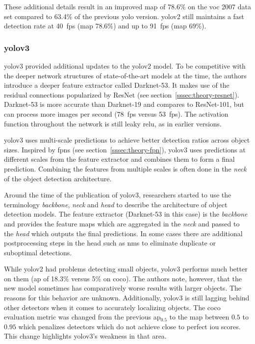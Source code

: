 \documentclass[draft,final]{vutinfth} %
\begin{document}
These additional details result in an improved \gls{map} of 78.6\% on
the \gls{voc} 2007 data set compared to 63.4\% of the previous
\gls{yolo} version. \gls{yolo}v2 still maintains a fast detection rate
at \qty{40}{fps} (\gls{map} 78.6\%) and up to \qty{91}{fps} (\gls{map}
69\%).

\subsubsection{\gls{yolo}v3}
\label{sssec:yolov3}

\gls{yolo}v3 \cite{redmon2018} provided additional updates to the
\gls{yolo}v2 model. To be competitive with the deeper network
structures of state-of-the-art models at the time, the authors
introduce a deeper feature extractor called Darknet-53. It makes use
of the residual connections popularized by ResNet \cite{he2016} (see
section~\ref{sssec:theory-resnet}). Darknet-53 is more accurate than
Darknet-19 and compares to ResNet-101, but can process more images per
second (\qty{78}{fps} versus \qty{53}{fps}). The activation function
throughout the network is still leaky \gls{relu}, as in earlier
versions.

\gls{yolo}v3 uses multi-scale predictions to achieve better detection
ratios across object sizes. Inspired by \glspl{fpn} (see
section~\ref{sssec:theory-fpn}), \gls{yolo}v3 uses predictions at
different scales from the feature extractor and combines them to form
a final prediction. Combining the features from multiple scales is
often done in the \emph{neck} of the object detection architecture.

Around the time of the publication of \gls{yolo}v3, researchers
started to use the terminology \emph{backbone}, \emph{neck} and
\emph{head} to describe the architecture of object detection
models. The feature extractor (Darknet-53 in this case) is the
\emph{backbone} and provides the feature maps which are aggregated in
the \emph{neck} and passed to the \emph{head} which outputs the final
predictions. In some cases there are additional postprocessing steps
in the head such as \gls{nms} to eliminate duplicate or suboptimal
detections.

While \gls{yolo}v2 had problems detecting small objects, \gls{yolo}v3
performs much better on them (\gls{ap} of 18.3\% versus 5\% on
\gls{coco}). The authors note, however, that the new model sometimes
has comparatively worse results with larger objects. The reasons for
this behavior are unknown. Additionally, \gls{yolo}v3 is still lagging
behind other detectors when it comes to accurately localizing
objects. The \gls{coco} evaluation metric was changed from the
previous \gls{ap}$_{0.5}$ to the \gls{map} between $0.5$ to $0.95$
which penalizes detectors which do not achieve close to perfect
\gls{iou} scores. This change highlights \gls{yolo}v3's weakness in
that area.
\end{document}
